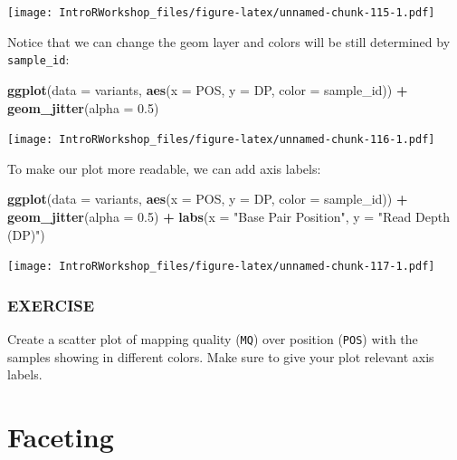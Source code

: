 \documentclass[]{book}
\newenvironment{Shaded}{\begin{snugshade}}{\end{snugshade}}
\newcommand{\DataTypeTok}[1]{\textcolor[rgb]{0.13,0.29,0.53}{#1}}
\newcommand{\FloatTok}[1]{\textcolor[rgb]{0.00,0.00,0.81}{#1}}
\newcommand{\KeywordTok}[1]{\textcolor[rgb]{0.13,0.29,0.53}{\textbf{#1}}}
\newcommand{\NormalTok}[1]{#1}
\newcommand{\OperatorTok}[1]{\textcolor[rgb]{0.81,0.36,0.00}{\textbf{#1}}}
\newcommand{\StringTok}[1]{\textcolor[rgb]{0.31,0.60,0.02}{#1}}
\begin{document}
\texttt{[image: IntroRWorkshop\_files/figure-latex/unnamed-chunk-115-1.pdf]}

Notice that we can change the geom layer and colors will be still determined by \texttt{sample\_id}:

\begin{Shaded}
\begin{Highlighting}[]
\KeywordTok{ggplot}\NormalTok{(}\DataTypeTok{data =}\NormalTok{ variants, }\KeywordTok{aes}\NormalTok{(}\DataTypeTok{x =}\NormalTok{ POS, }\DataTypeTok{y =}\NormalTok{ DP, }\DataTypeTok{color =}\NormalTok{ sample_id)) }\OperatorTok{+}\StringTok{ }
\StringTok{  }\KeywordTok{geom_jitter}\NormalTok{(}\DataTypeTok{alpha =} \FloatTok{0.5}\NormalTok{)}
\end{Highlighting}
\end{Shaded}

\texttt{[image: IntroRWorkshop\_files/figure-latex/unnamed-chunk-116-1.pdf]}

To make our plot more readable, we can add axis labels:

\begin{Shaded}
\begin{Highlighting}[]
\KeywordTok{ggplot}\NormalTok{(}\DataTypeTok{data =}\NormalTok{ variants, }\KeywordTok{aes}\NormalTok{(}\DataTypeTok{x =}\NormalTok{ POS, }\DataTypeTok{y =}\NormalTok{ DP, }\DataTypeTok{color =}\NormalTok{ sample_id)) }\OperatorTok{+}\StringTok{ }
\StringTok{  }\KeywordTok{geom_jitter}\NormalTok{(}\DataTypeTok{alpha =} \FloatTok{0.5}\NormalTok{) }\OperatorTok{+}\StringTok{ }
\StringTok{  }\KeywordTok{labs}\NormalTok{(}\DataTypeTok{x =} \StringTok{"Base Pair Position"}\NormalTok{, }
       \DataTypeTok{y =} \StringTok{"Read Depth (DP)"}\NormalTok{)}
\end{Highlighting}
\end{Shaded}

\texttt{[image: IntroRWorkshop\_files/figure-latex/unnamed-chunk-117-1.pdf]}

\hypertarget{exercise-24}{%
\subsubsection*{EXERCISE}\label{exercise-24}}

Create a scatter plot of mapping quality (\texttt{MQ}) over position (\texttt{POS}) with the samples showing in different colors. Make sure to give your plot relevant axis labels.

\hypertarget{faceting}{%
\section{Faceting}\label{faceting}}
\end{document}
